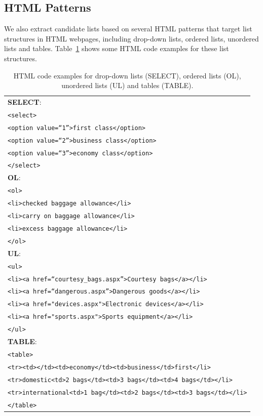 \subsection{HTML Patterns}
We also extract candidate lists based on several HTML patterns that target list structures in HTML webpages, including drop-down lists, ordered lists, unordered lists and tables. Table~\ref{tab:facet-html} shows some HTML code examples for these list structures.
\begin{table}[ht!]
\centering
\caption{HTML code examples for drop-down lists (SELECT), ordered lists (OL), unordered lists (UL) and tables (TABLE).} 
\label{tab:facet-html}
\begin{tabular}{|l|} \hline
\textbf{SELECT}: \\
\texttt{<select>}\\
\texttt{<option value=``1''>first class</option>}\\
\texttt{<option value=``2''>business class</option>}\\
\texttt{<option value=``3''>economy class</option>}\\
\texttt{</select>}\\\hline
\textbf{OL}: \\
\texttt{<ol>}\\
\texttt{<li>checked baggage allowance</li>}\\
\texttt{<li>carry on baggage allowance</li>}\\
\texttt{<li>excess baggage allowance</li>}\\
\texttt{</ol>}\\\hline
\textbf{UL}: \\
\texttt{<ul>} \\
\texttt{<li><a href=``courtesy\_bags.aspx''>Courtesy bags</a></li>}\\
\texttt{<li><a href=``dangerous.aspx''>Dangerous goods</a></li>}\\
\texttt{<li><a href="devices.aspx">Electronic devices</a></li>}\\
\texttt{<li><a href="sports.aspx">Sports equipment</a></li>}\\
\texttt{</ul>}\\\hline
\textbf{TABLE}: \\
\texttt{<table>}\\
\texttt{\small<tr><td></td><td>economy</td><td>business</td>first</li>}\\
\texttt{\small<tr>domestic<td>2 bags</td><td>3 bags</td><td>4 bags</td></li>}\\
\texttt{\footnotesize<tr>international<td>1 bag</td><td>2 bags</td><td>3 bags</td></li>}\\
\texttt{\small</table>}\\\hline
\end{tabular}
\end{table}

